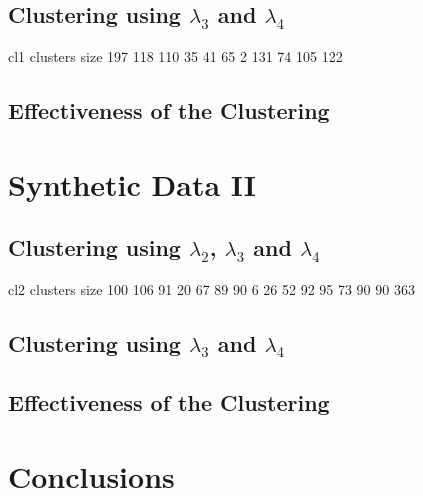 \subsection{Clustering using $\lambda_{3}$ and $\lambda_{4}$}

 cl1 clusters size
  197 118 110  35  41  65   2 131  74 105 122
 

\subsection{Effectiveness of the Clustering}

\section{Synthetic Data II}

\subsection{Clustering using $\lambda_{2}$, $\lambda_{3}$ and $\lambda_{4}$}
cl2 clusters size
  100 106  91  20  67  89  90   6  26  52  92  95  73  90  90 363

\subsection{Clustering using $\lambda_{3}$ and $\lambda_{4}$}

\subsection{Effectiveness of the Clustering}

\section{Conclusions}